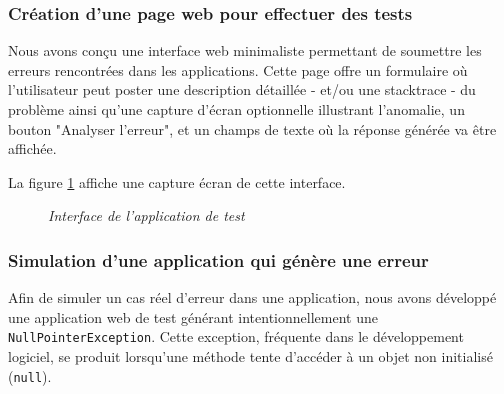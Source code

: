 \documentclass[12pt,a4paper]{report}
\begin{document}
	\subsubsection{Création d'une page web pour effectuer des tests}
	
	Nous avons conçu une interface web minimaliste permettant de soumettre les erreurs rencontrées dans les applications. Cette page offre un formulaire où l'utilisateur peut poster une description détaillée - et/ou une stacktrace  - du problème ainsi qu’une capture d’écran optionnelle illustrant l’anomalie, un bouton "Analyser l'erreur", et un champs de texte où la réponse générée va être affichée.
	
	La figure \ref{fig:interface} affiche une capture écran de cette interface.
	
	\begin{figure}[H]
		\centering
		\caption{\textit{Interface de l'application de test}}
		\label{fig:interface}
	\end{figure}
	
	
	\subsubsection{Simulation d'une application qui génère une erreur}
	
	Afin de simuler un cas réel d'erreur dans une application, nous avons développé une application web de test générant intentionnellement une \verb|NullPointerException|. Cette exception, fréquente dans le développement logiciel, se produit lorsqu'une méthode tente d'accéder à un objet non initialisé (\verb|null|).
	
\end{document}
